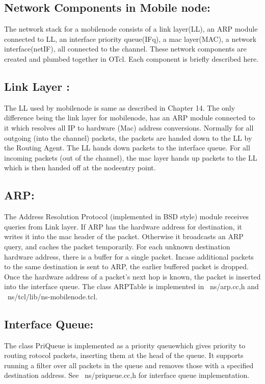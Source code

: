 \documentclass[11pt]{article}
\begin{document}
\subsection{Network Components in Mobile node: }


The network stack for a mobilenode consists of a link
layer(LL), an ARP module connected to LL, an interface priority queue(IFq), a mac layer(MAC), a
network interface(netIF), all connected to the channel. These network components are created and
plumbed together in OTcl. Each component is briefly described here.

\subsection{Link Layer : }

The LL used by mobilenode is same as described in Chapter 14. The only difference being
the link layer for mobilenode, has an ARP module connected to it which resolves all IP to hardware
(Mac) address conversions. Normally for all outgoing (into the channel) packets, the packets are handed
down to the LL by the Routing Agent. The LL hands down packets to the interface queue. For all
incoming packets (out of the channel), the mac layer hands up packets to the LL which is then
handed off at the nodeentry point.

\subsection{ARP: }


The Address Resolution Protocol (implemented in BSD style) module receives queries from Link
layer. If ARP has the hardware address for destination, it writes it into the mac header of the packet.
Otherwise it broadcasts an ARP query, and caches the packet temporarily. For each unknown destination
hardware address, there is a buffer for a single packet. Incase additional packets to the same destination is
sent to ARP, the earlier buffered packet is dropped. Once the hardware address of a packet’s next hop is
known, the packet is inserted into the interface queue. The class ARPTable is implemented in
~ns/arp.{cc,h} and ~ns/tcl/lib/ns-mobilenode.tcl.
\subsection{Interface Queue: }


The class PriQueue is implemented as a priority queuewhich gives priority to routing
rotocol packets, inserting them at the head of the queue. It supports running a filter over all packets in the
queue and removes those with a specified destination address. See ~ns/priqueue.{cc,h} for interface
queue implementation.
\end{document}
